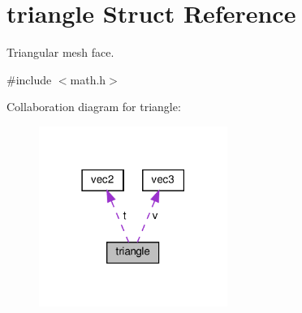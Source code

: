 \hypertarget{structtriangle}{}\section{triangle Struct Reference}
\label{structtriangle}


Triangular mesh face.  




{\ttfamily \#include $<$math.\+h$>$}



Collaboration diagram for triangle\+:\nopagebreak
\begin{figure}[H]
\begin{center}
\leavevmode
\includegraphics[width=174pt]{structtriangle__coll__graph}
\end{center}
\end{figure}
